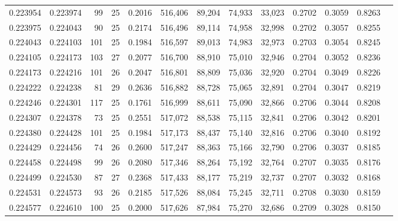\begin{tabular}{rrrrrrrrrrrrr}
0.223954 & 0.223974 &  99 &  25 &                                     0.2016 & 516,406 &  89,204 &  74,933 &  33,023 & 0.2702 & 0.3059 & 0.8263 \\
0.223975 & 0.224043 &  90 &  25 &                                     0.2174 & 516,496 &  89,114 &  74,958 &  32,998 & 0.2702 & 0.3057 & 0.8255 \\
0.224043 & 0.224103 & 101 &  25 &                                     0.1984 & 516,597 &  89,013 &  74,983 &  32,973 & 0.2703 & 0.3054 & 0.8245 \\
0.224105 & 0.224173 & 103 &  27 &                                     0.2077 & 516,700 &  88,910 &  75,010 &  32,946 & 0.2704 & 0.3052 & 0.8236 \\
0.224173 & 0.224216 & 101 &  26 &                                     0.2047 & 516,801 &  88,809 &  75,036 &  32,920 & 0.2704 & 0.3049 & 0.8226 \\
0.224222 & 0.224238 &  81 &  29 &                                     0.2636 & 516,882 &  88,728 &  75,065 &  32,891 & 0.2704 & 0.3047 & 0.8219 \\
0.224246 & 0.224301 & 117 &  25 &                                     0.1761 & 516,999 &  88,611 &  75,090 &  32,866 & 0.2706 & 0.3044 & 0.8208 \\
0.224307 & 0.224378 &  73 &  25 &                                     0.2551 & 517,072 &  88,538 &  75,115 &  32,841 & 0.2706 & 0.3042 & 0.8201 \\
0.224380 & 0.224428 & 101 &  25 &                                     0.1984 & 517,173 &  88,437 &  75,140 &  32,816 & 0.2706 & 0.3040 & 0.8192 \\
0.224429 & 0.224456 &  74 &  26 &                                     0.2600 & 517,247 &  88,363 &  75,166 &  32,790 & 0.2706 & 0.3037 & 0.8185 \\
0.224458 & 0.224498 &  99 &  26 &                                     0.2080 & 517,346 &  88,264 &  75,192 &  32,764 & 0.2707 & 0.3035 & 0.8176 \\
0.224499 & 0.224530 &  87 &  27 &                                     0.2368 & 517,433 &  88,177 &  75,219 &  32,737 & 0.2707 & 0.3032 & 0.8168 \\
0.224531 & 0.224573 &  93 &  26 &                                     0.2185 & 517,526 &  88,084 &  75,245 &  32,711 & 0.2708 & 0.3030 & 0.8159 \\
0.224577 & 0.224610 & 100 &  25 &                                     0.2000 & 517,626 &  87,984 &  75,270 &  32,686 & 0.2709 & 0.3028 & 0.8150 \\

\end{tabular}
